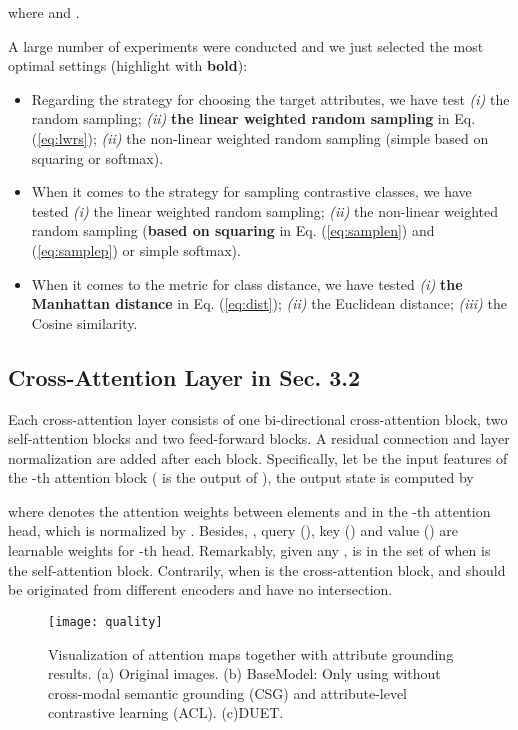 \documentclass[letterpaper]{article} \usepackage{aaai23}  \usepackage{times}  \usepackage{helvet}  \usepackage{courier}  \usepackage[hyphens]{url}  \usepackage{graphicx} \urlstyle{rm} \def\UrlFont{\rm}  \usepackage{natbib}  \usepackage{caption} \frenchspacing  \setlength{\pdfpagewidth}{8.5in}  \setlength{\pdfpageheight}{11in}  \usepackage{algorithm}
\begin{document}
where  {and} .

A large number of experiments were conducted and we just selected the most optimal settings (highlight with \textbf{bold}):
\begin{itemize}
\item Regarding the strategy for choosing the target attributes, we have test \textit{(i)} the random sampling; \textit{(ii)} \textbf{the linear weighted random sampling} in Eq. (\ref{eq:lwrs}); \textit{(ii)} the non-linear weighted random sampling (simple based on squaring or softmax).
\item When it comes to the strategy for sampling contrastive classes, we have tested \textit{(i)} the linear weighted random sampling;  \textit{(ii)} the non-linear weighted random sampling (\textbf{based on squaring} in Eq. (\ref{eq:samplen}) and (\ref{eq:samplep}) or simple softmax).
\item When it comes to the metric for class distance, we have tested \textit{(i)} \textbf{the Manhattan distance} in Eq. (\ref{eq:dist}); \textit{(ii)} the Euclidean distance; \textit{(iii)} the Cosine similarity.
\end{itemize}


\subsection{Cross-Attention Layer in Sec. 3.2} \label{apd:cross}
Each cross-attention layer consists of one bi-directional cross-attention block, two self-attention blocks and two feed-forward blocks. A residual connection and
layer normalization are added after each block. 
Specifically, let  be the input features of the -th attention block  ( is the output of ), the output state  is computed by

where  denotes the attention weights between elements  and  in the -th attention head, which is normalized by . Besides, , query (), key () and value () are learnable weights for -th head. 
Remarkably, given any ,   is in the set of  when  is the self-attention block. 
Contrarily, when  is the cross-attention block,  and  should be originated from different encoder{s} and have no intersection. 

\begin{figure*}[htbp]
  \centering
  \texttt{[image: quality]}
  \caption{Visualization of attention maps together with attribute grounding results.
    (a) Original images.
  	(b) BaseModel: Only using  without cross-modal semantic grounding (CSG) and attribute-level contrastive learning (ACL).
	(c)DUET.
  }
  \label{fig:Visualization}
\end{figure*}
\end{document}
